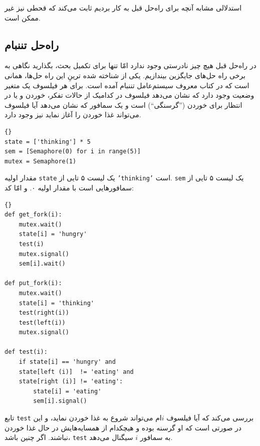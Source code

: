 \documentclass{book}
\newcommand{\clearemptydoublepage}{\newpage\cleardoublepage}
\begin{document}
    استدلالی مشابه آنچه برای راه‌حل قبل به کار بردیم ثابت می‌کند که قحطی نیز غیر ممکن است. 


\clearemptydoublepage
\subsection{راه‌حل تننبام}

    در راه‌حل قبل هیچ چیز نادرستی وجود ندارد امّا تنها برای تکمیل بحث، بگذارید نگاهی به برخی راه حل‌های جایگزین بیندازیم. 
    یکی از شناخته‌ شده ترینِ  این راه حل‌ها، همانی است که در کتاب معروف سیستم‌عامل تننبام آمده است\cite{tanenbaum}. 
    برای هر فیلسوف یک متغیر وضعیت وجود دارد که نشان می‌دهد فیلسوف در کدامیک از حالات تفکر، 
    خوردن و یا در انتظار برای خوردن (''گرسنگی``) است و 
    یک سمافور که نشان می‌دهد آیا فیلسوف می‌تواند غذا خوردن را آغاز نماید نیز وجود دارد. 

\begin{latin}
\begin{lstlisting}[title=\rl{متغیرهای راه‌حل تننبام}]{}
state = ['thinking'] * 5
sem = [Semaphore(0) for i in range(5)]
mutex = Semaphore(1)
\end{lstlisting}
\end{latin}

    مقدار اولیه {\tt state} یک لیست ۵ تایی از {\tt 'thinking'} است.     {\tt sem}
    یک لیست ۵ تایی از سمافورهایی است با مقدار اولیه ۰. 
    و امّا کد: 

\begin{latin}
\begin{lstlisting}[title=\rl{ راه‌حل تننبام}]{}
def get_fork(i):
    mutex.wait()
    state[i] = 'hungry'
    test(i)
    mutex.signal()
    sem[i].wait()

def put_fork(i):
    mutex.wait()
    state[i] = 'thinking'
    test(right(i))
    test(left(i))
    mutex.signal()

def test(i):
    if state[i] == 'hungry' and
    state[left (i)]  != 'eating' and
    state[right (i)] != 'eating':
        state[i] = 'eating'
        sem[i].signal()
\end{lstlisting}
\end{latin}


    تابع {\tt test}  بررسی می‌کند که آیا فیلسوف $i$ام می‌تواند شروع به غذا خوردن نماید، و این در صورتی است که 
    او گرسنه بوده و هیچکدام از همسایه‌هایش در حال غذا خوردن نباشند. اگر چنین باشد، {\tt test} به سمافور $i$ سیگنال می‌دهد. 
    
\end{document}
